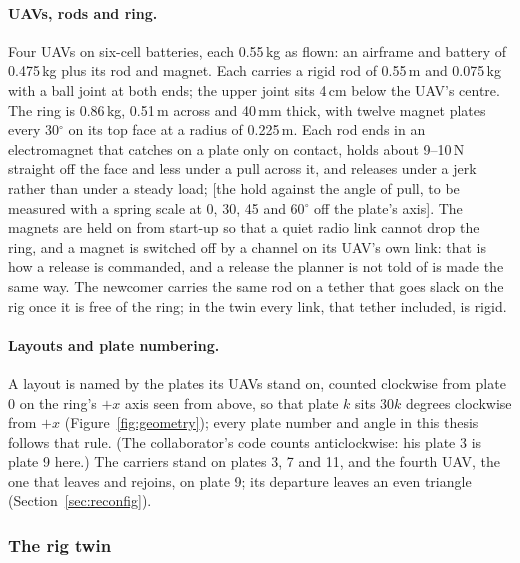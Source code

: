 \paragraph{UAVs, rods and ring.} Four UAVs on six-cell batteries, each 0.55\,kg as flown: an airframe and battery of
0.475\,kg plus its rod and magnet. Each carries a rigid rod of 0.55\,m and 0.075\,kg with a ball joint at both
ends; the upper joint sits 4\,cm below the UAV's centre. The ring is 0.86\,kg, 0.51\,m across and 40\,mm thick, with
twelve magnet plates every 30$^\circ$ on its top face at a radius of 0.225\,m. Each rod ends in an electromagnet
that catches on a plate only on contact, holds about 9--10\,N straight off the face and less under a pull across
it, and releases under a jerk rather than under a steady load; [the hold against the angle of pull, to be measured
with a spring scale at 0, 30, 45 and 60$^\circ$ off the plate's axis]. The magnets are held on from
start-up so that a quiet radio link cannot drop the ring, and a magnet is switched off by a channel on its UAV's
own link: that is how a release is commanded, and a release the planner is not told of is made the same way. The
newcomer carries the same rod on a tether that goes slack on the rig once it is free of the ring; in the twin
every link, that tether included, is rigid.

\paragraph{Layouts and plate numbering.} A layout is named by the plates its UAVs stand on, counted clockwise
from plate 0 on the ring's $+x$ axis seen from above, so that plate $k$ sits $30k$ degrees clockwise from $+x$
(Figure~\ref{fig:geometry}); every plate number and angle in this thesis follows that rule. (The collaborator's
code counts anticlockwise: his plate 3 is plate 9 here.) The carriers stand on plates 3, 7 and 11, and the fourth
UAV, the one that leaves and rejoins, on plate 9; its departure leaves an even triangle
(Section~\ref{sec:reconfig}).




\subsubsection{The rig twin}
\label{sec:simulation}

